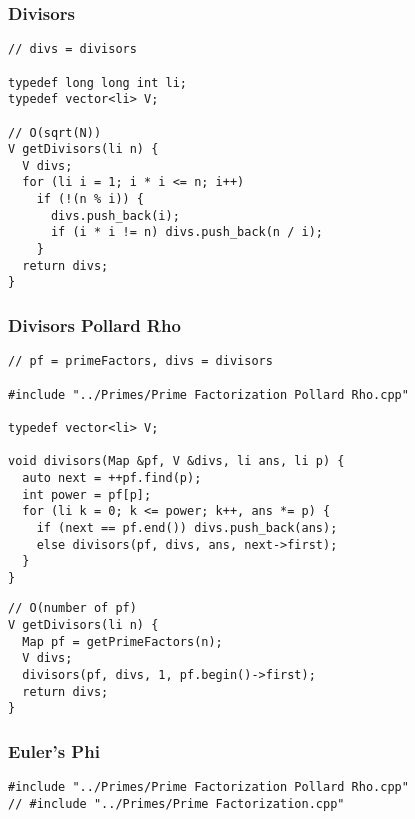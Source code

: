 \documentclass[twoside]{article}
\begin{document}
\begin{multicols*}{2}
\begin{verbatim}
\end{verbatim}

\subsubsectionfont{\large\bfseries\sffamily\underline}
\subsubsection*{Divisors}
\begin{verbatim}
// divs = divisors

typedef long long int li;
typedef vector<li> V;

// O(sqrt(N))
V getDivisors(li n) {
  V divs;
  for (li i = 1; i * i <= n; i++)
    if (!(n % i)) {
      divs.push_back(i);
      if (i * i != n) divs.push_back(n / i);
    }
  return divs;
}
\end{verbatim}

\subsubsectionfont{\large\bfseries\sffamily\underline}
\subsubsection*{Divisors Pollard Rho}
\begin{verbatim}
// pf = primeFactors, divs = divisors

#include "../Primes/Prime Factorization Pollard Rho.cpp"

typedef vector<li> V;

void divisors(Map &pf, V &divs, li ans, li p) {
  auto next = ++pf.find(p);
  int power = pf[p];
  for (li k = 0; k <= power; k++, ans *= p) {
    if (next == pf.end()) divs.push_back(ans);
    else divisors(pf, divs, ans, next->first);
  }
}
\end{verbatim}
\vspace{-12pt}
\begin{verbatim}
// O(number of pf)
V getDivisors(li n) {
  Map pf = getPrimeFactors(n);
  V divs;
  divisors(pf, divs, 1, pf.begin()->first);
  return divs;
}
\end{verbatim}

\subsubsectionfont{\large\bfseries\sffamily\underline}
\subsubsection*{Euler's Phi}
\begin{verbatim}
#include "../Primes/Prime Factorization Pollard Rho.cpp"
// #include "../Primes/Prime Factorization.cpp"


\end{verbatim}
\end{multicols*}
\end{document}
